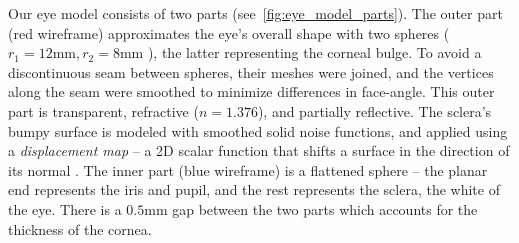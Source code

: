 


Our eye model consists of two parts (see~\autoref{fig:eye_model_parts}).
The outer part (red wireframe) approximates the eye's overall shape with two spheres ($r_1\!=\!12\textrm{mm}, r_2\!=\!8\textrm{mm}$ \cite{ruhland2014look}), the latter representing the corneal bulge.
To avoid a discontinuous seam between spheres, their meshes were joined, and the vertices along the seam were smoothed to minimize differences in face-angle.
This outer part is transparent, refractive ($n\!=\!1.376$), and partially reflective.
The sclera's bumpy surface is modeled with smoothed solid noise functions, and applied using a \emph{displacement map} -- a 2D scalar function that shifts a surface in the direction of its normal \cite{lee2000displaced}.
The inner part (blue wireframe) is a flattened sphere  -- the planar end represents the iris and pupil, and the rest represents the sclera, the white of the eye.
There is a $0.5\textrm{mm}$ gap between the two parts which accounts for the thickness of the cornea.

